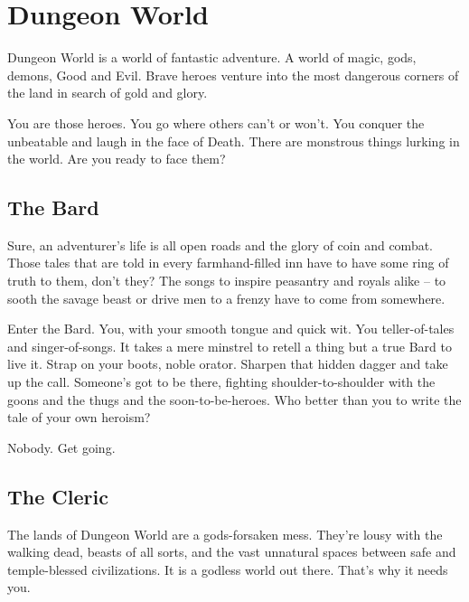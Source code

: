 \chapter{Dungeon World}
   
       

         

Dungeon World is a world of fantastic adventure. A world of magic, gods, demons, Good and Evil. Brave heroes venture into the most dangerous corners of the land in search of gold and glory.

         

You are those heroes. You go where others can't or won't. You conquer the unbeatable and laugh in the face of Death. There are monstrous things lurking in the world. Are you ready to face them?

         
\section{The Bard}   
         

Sure, an adventurer’s life is all open roads and the glory of coin and combat. Those tales that are told in every farmhand-filled inn have to have some ring of truth to them, don’t they? The songs to inspire peasantry and royals alike – to sooth the savage beast or drive men to a frenzy have to come from somewhere.

         

Enter the Bard. You, with your smooth tongue and quick wit. You teller-of-tales and singer-of-songs. It takes a mere minstrel to retell a thing but a true Bard to live it. Strap on your boots, noble orator. Sharpen that hidden dagger and take up the call. Someone’s got to be there, fighting shoulder-to-shoulder with the goons and the thugs and the soon-to-be-heroes. Who better than you to write the tale of your own heroism?

         

Nobody. Get going.

         
\section{The Cleric}   
         

The lands of Dungeon World are a gods-forsaken mess. They’re lousy with the walking dead, beasts of all sorts, and the vast unnatural spaces between safe and temple-blessed civilizations. It is a godless world out there. That’s why it needs you.

